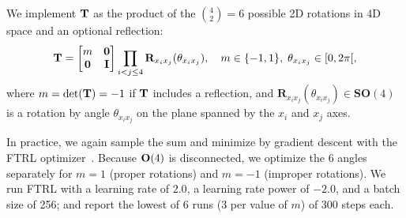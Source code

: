 We implement $\mathbf{T}$ as the product of the $\binom{4}{2}=6$ possible 2D rotations in 4D space and an optional reflection:
\begin{equation*}
    \mathbf{T} =
    \begin{bmatrix}
        m & \mathbf{0} \\
        \mathbf{0} & \mathbf{I} \\
    \end{bmatrix}
    \prod_{i < j \leq 4} \mathbf{R}_{x_i x_j}(\theta_{x_i x_j}),
    \quad m \in \{-1,1\}, \; \theta_{x_i x_j} \in [0, 2\pi[,
\end{equation*}
where $m = \det(\mathbf{T}) = -1$ if $\mathbf{T}$ includes a reflection, and $\mathbf{R}_{x_i x_j}(\theta_{x_i x_j}) \in \mathbf{SO}(4)$ is a rotation by angle $\theta_{x_i x_j}$ on the plane spanned by the $x_i$ and $x_j$ axes.

In practice, we again sample the sum and minimize  by gradient descent with the FTRL optimizer~\cite{mcmahan_ad_2013}.
Because $\mathrm{\mathbf{O}}(4)$ is disconnected, we optimize the 6 angles separately for $m = 1$ (proper rotations) and $m = -1$ (improper rotations).
We run FTRL with a learning rate of $2.0$, a learning rate power of $-2.0$, and a batch size of 256; and report the lowest of 6 runs (3 per value of $m$) of 300 steps each.


